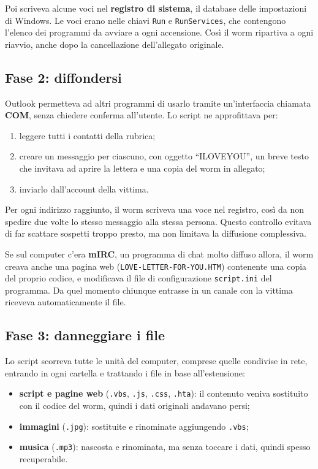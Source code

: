 Poi scriveva alcune voci nel \textbf{registro di sistema}, il database delle impostazioni di Windows. Le voci erano nelle chiavi \texttt{Run} e \texttt{RunServices}, che contengono l'elenco dei programmi da avviare a ogni accensione. Così il worm ripartiva a ogni riavvio, anche dopo la cancellazione dell'allegato originale.

\subsection{Fase 2: diffondersi}

Outlook permetteva ad altri programmi di usarlo tramite un'interfaccia chiamata \textbf{COM}, senza chiedere conferma all'utente. Lo script ne approfittava per:

\begin{enumerate}
    \item leggere tutti i contatti della rubrica;
    \item creare un messaggio per ciascuno, con oggetto ``ILOVEYOU'', un breve testo che invitava ad aprire la lettera e una copia del worm in allegato;
    \item inviarlo dall'account della vittima.
\end{enumerate}

Per ogni indirizzo raggiunto, il worm scriveva una voce nel registro, così da non spedire due volte lo stesso messaggio alla stessa persona. Questo controllo evitava di far scattare sospetti troppo presto, ma non limitava la diffusione complessiva.

Se sul computer c'era \textbf{mIRC}, un programma di chat molto diffuso allora, il worm creava anche una pagina web (\texttt{LOVE-LETTER-FOR-YOU.HTM}) contenente una copia del proprio codice, e modificava il file di configurazione \texttt{script.ini} del programma. Da quel momento chiunque entrasse in un canale con la vittima riceveva automaticamente il file.

\subsection{Fase 3: danneggiare i file}

Lo script scorreva tutte le unità del computer, comprese quelle condivise in rete, entrando in ogni cartella e trattando i file in base all'estensione:

\begin{itemize}
    \item \textbf{script e pagine web} (\texttt{.vbs}, \texttt{.js}, \texttt{.css}, \texttt{.hta}): il contenuto veniva sostituito con il codice del worm, quindi i dati originali andavano persi;
    \item \textbf{immagini} (\texttt{.jpg}): sostituite e rinominate aggiungendo \texttt{.vbs};
    \item \textbf{musica} (\texttt{.mp3}): nascosta e rinominata, ma senza toccare i dati, quindi spesso recuperabile.
\end{itemize}

